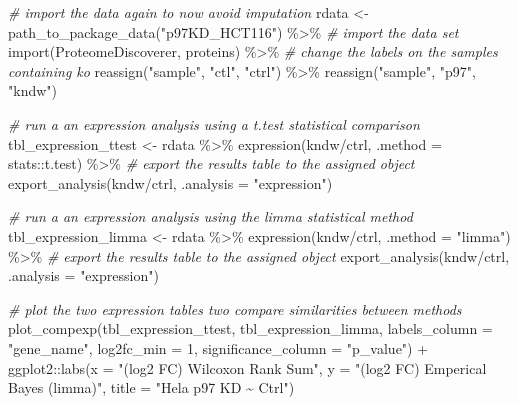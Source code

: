 \documentclass[
]{book}
\newenvironment{Shaded}{\begin{snugshade}}{\end{snugshade}}
\newcommand{\AttributeTok}[1]{\textcolor[rgb]{0.77,0.63,0.00}{#1}}
\newcommand{\CommentTok}[1]{\textcolor[rgb]{0.56,0.35,0.01}{\textit{#1}}}
\newcommand{\DecValTok}[1]{\textcolor[rgb]{0.00,0.00,0.81}{#1}}
\newcommand{\FunctionTok}[1]{\textcolor[rgb]{0.00,0.00,0.00}{#1}}
\newcommand{\NormalTok}[1]{#1}
\newcommand{\OtherTok}[1]{\textcolor[rgb]{0.56,0.35,0.01}{#1}}
\newcommand{\SpecialCharTok}[1]{\textcolor[rgb]{0.00,0.00,0.00}{#1}}
\newcommand{\StringTok}[1]{\textcolor[rgb]{0.31,0.60,0.02}{#1}}
\begin{document}
\begin{Shaded}
\begin{Highlighting}[]
\CommentTok{\# import the data again to now avoid imputation}
\NormalTok{rdata }\OtherTok{\textless{}{-}} \FunctionTok{path\_to\_package\_data}\NormalTok{(}\StringTok{"p97KD\_HCT116"}\NormalTok{) }\SpecialCharTok{\%\textgreater{}\%}
  \CommentTok{\# import the data set}
  \FunctionTok{import}\NormalTok{(}\StringTok{\textquotesingle{}ProteomeDiscoverer\textquotesingle{}}\NormalTok{, }\StringTok{\textquotesingle{}proteins\textquotesingle{}}\NormalTok{) }\SpecialCharTok{\%\textgreater{}\%}
  \CommentTok{\# change the labels on the samples containing \textquotesingle{}ko\textquotesingle{}}
  \FunctionTok{reassign}\NormalTok{(}\StringTok{"sample"}\NormalTok{, }\StringTok{"ctl"}\NormalTok{, }\StringTok{"ctrl"}\NormalTok{) }\SpecialCharTok{\%\textgreater{}\%}
  \FunctionTok{reassign}\NormalTok{(}\StringTok{"sample"}\NormalTok{, }\StringTok{"p97"}\NormalTok{, }\StringTok{"kndw"}\NormalTok{)}

\CommentTok{\# run a an expression analysis using a t.test statistical comparison}
\NormalTok{tbl\_expression\_ttest }\OtherTok{\textless{}{-}}\NormalTok{ rdata }\SpecialCharTok{\%\textgreater{}\%}
  \FunctionTok{expression}\NormalTok{(kndw}\SpecialCharTok{/}\NormalTok{ctrl, }\AttributeTok{.method =}\NormalTok{ stats}\SpecialCharTok{::}\NormalTok{t.test) }\SpecialCharTok{\%\textgreater{}\%}
  \CommentTok{\# export the results table to the assigned object}
  \FunctionTok{export\_analysis}\NormalTok{(kndw}\SpecialCharTok{/}\NormalTok{ctrl, }\AttributeTok{.analysis =} \StringTok{"expression"}\NormalTok{)}

\CommentTok{\# run a an expression analysis using the limma statistical method}
\NormalTok{tbl\_expression\_limma }\OtherTok{\textless{}{-}}\NormalTok{ rdata }\SpecialCharTok{\%\textgreater{}\%}
  \FunctionTok{expression}\NormalTok{(kndw}\SpecialCharTok{/}\NormalTok{ctrl, }\AttributeTok{.method =} \StringTok{"limma"}\NormalTok{) }\SpecialCharTok{\%\textgreater{}\%}
  \CommentTok{\# export the results table to the assigned object}
  \FunctionTok{export\_analysis}\NormalTok{(kndw}\SpecialCharTok{/}\NormalTok{ctrl, }\AttributeTok{.analysis =} \StringTok{"expression"}\NormalTok{)}

\CommentTok{\# plot the two expression tables two compare similarities between methods}
\FunctionTok{plot\_compexp}\NormalTok{(tbl\_expression\_ttest,}
\NormalTok{             tbl\_expression\_limma,}
             \AttributeTok{labels\_column =} \StringTok{"gene\_name"}\NormalTok{,}
             \AttributeTok{log2fc\_min =} \DecValTok{1}\NormalTok{, }\AttributeTok{significance\_column =} \StringTok{"p\_value"}\NormalTok{) }\SpecialCharTok{+}
\NormalTok{  ggplot2}\SpecialCharTok{::}\FunctionTok{labs}\NormalTok{(}\AttributeTok{x =} \StringTok{"(log2 FC) Wilcoxon Rank Sum"}\NormalTok{,}
                \AttributeTok{y =} \StringTok{"(log2 FC) Emperical Bayes (limma)"}\NormalTok{,}
                \AttributeTok{title =} \StringTok{"Hela p97 KD \textasciitilde{} Ctrl"}\NormalTok{)}


\end{Highlighting}
\end{Shaded}
\end{document}
